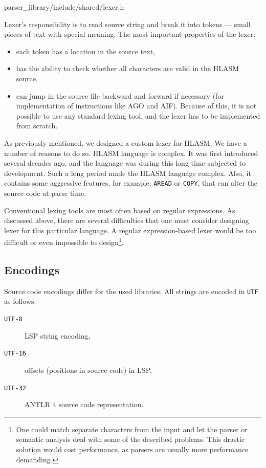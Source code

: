{parser\_library/include/shared/lexer.h}

Lexer's responsibility is to read source string and break it into tokens --- small pieces of text with special meaning. The most important properties of the lexer:
\begin{itemize}
	\item each token has a location in the source text,
	\item has the ability to check whether all characters are valid in the HLASM source,
	\item can jump in the source file backward and forward if necessary (for implementation of instructions like AGO and AIF). Because of this, it is not possible to use any standard lexing tool, and the lexer has to be implemented from scratch.
\end{itemize}

As previously mentioned, we designed a custom lexer for HLASM. We have a number of reasons to do so. HLASM language is complex. It was first introduced several decades ago, and the language was during this long time subjected to development. Such a long period made the HLASM language complex. Also, it contains some aggressive features, for example, \texttt{AREAD} or \texttt{COPY}, that can alter the source code at parse time.

Conventional lexing tools are most often based on regular expressions. As discussed above, there are several difficulties that one must consider designing lexer for this particular language. A regular expression-based lexer would be too difficult or even impossible to design\footnote{One could match separate characters from the input and let the parser or semantic analysis deal with some of the described problems. This drastic solution would cost performance, as parsers are usually more performance demanding.}.

\subsection{Encodings}
Source code encodings differ for the used libraries. All strings are encoded in \texttt{UTF} as follows:

\begin{description}
	\item[\texttt{UTF-8}] LSP string encoding,
	\item[\texttt{UTF-16}] offsets (positions in source code) in LSP,
	\item[\texttt{UTF-32}] ANTLR 4 source code representation.
\end{description}

